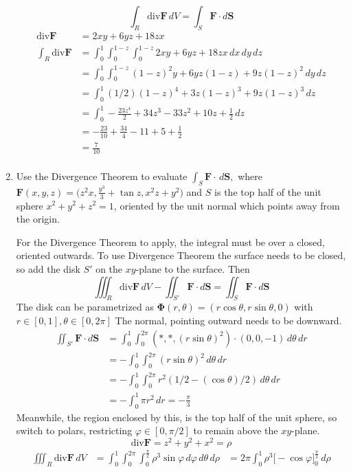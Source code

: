\documentclass{article}
\newcommand{\divt}{\text{div}}
\begin{document}
\begin{enumerate}
            \[\int_R \divt \boldsymbol F \, dV = \int_S \boldsymbol F \cdot d\boldsymbol S\]
            \begin{align*}
                \divt \boldsymbol F &= 2xy + 6yz + 18zx \\
                \int_R \divt \boldsymbol F &= \int_0^1 \int_0^{1-z} \int_0^{1-z} 2xy + 6yz + 18zx \, dx \, dy \, dz \\
                &= \int_0^1 \int_0^{1-z} (1-z)^2y + 6yz(1-z) + 9z(1-z)^2 \, dy \, dz \\
                &= \int_0^1 (1/2)(1-z)^4 + 3z(1-z)^3 + 9z(1-z)^3 \, dz \\
                &= \int_0^1 -\frac{23z^4}{2} + 34z^3 - 33z^2 + 10z + \frac{1}{2} \, dz \\
                &= -\frac{23}{10} + \frac{34}{4} - 11 + 5 + \frac{1}{2} \\
                &= \frac{7}{10} \\ 
            \end{align*}
            \newpage
\item Use the Divergence Theorem to evaluate $\displaystyle \int_S \boldsymbol F \cdot \, d \boldsymbol S,$ where $\displaystyle \boldsymbol F (x,y,z) = \bigg(z^2 x, \frac{y^3}{3} + \tan z, x^2z+y^2 \bigg)$ and $S$ is the top half of the unit sphere $x^2 + y^2 + z^2 = 1$, oriented by the unit normal which points away from the origin.
    
    For the Divergence Theorem to apply, the integral must be over a closed, oriented outwards. To use Divergence Theorem the surface needs to be closed, so add the disk $S'$ on the $xy$-plane to the surface. Then
    \[\iiint_R \divt \boldsymbol F \, dV - \iint_{S'} \boldsymbol F \cdot d \boldsymbol S = \iint_S \boldsymbol F \cdot d\boldsymbol S\]
    The disk can be parametrized as $\boldsymbol \Phi (r, \theta) = (r\cos \theta, r\sin \theta, 0)$ with $r \in [0,1], \theta \in [0,2\pi]$ The normal, pointing outward needs to be downward.
    \begin{align*} 
        \iint_{S'} \boldsymbol F \cdot d \boldsymbol S &= \int_0^1 \int_0^{2\pi} (*,*,(r\sin \theta)^2) \cdot (0,0,-1) \, d \theta \,d r \\
        &= - \int_0^1 \int_0^{2\pi} (r\sin \theta)^2 \, d \theta \,d r \\
        &= - \int_0^1 \int_0^{2\pi} r^2 (1/2 - (\cos \theta)/2) \, d \theta \,d r \\
        &= - \int_0^1 \pi r^2 \,d r = - \frac{\pi}{3}
    \end{align*}
    Meanwhile, the region enclosed by this, is the top half of the unit sphere, so switch to polars, restricting $\varphi \in [0,\pi/2]$ to remain above the $xy$-plane.
    \[\divt \boldsymbol F = z^2 + y^2 + x^2 = \rho\]
    \begin{align*} 
        \iiint_R \divt \boldsymbol F \, dV &= \int_0^1 \int_0^{2\pi} \int_0^{\frac{\pi}{2}} \rho^3 \sin\varphi \, d\varphi \, d\theta \, d \rho
        &= 2\pi \int_0^1 \rho^3 \big[ -\cos\varphi\big]_0^{\frac{\pi}{2}} \, d \rho
    \end{align*}


\end{enumerate}
\end{document}
